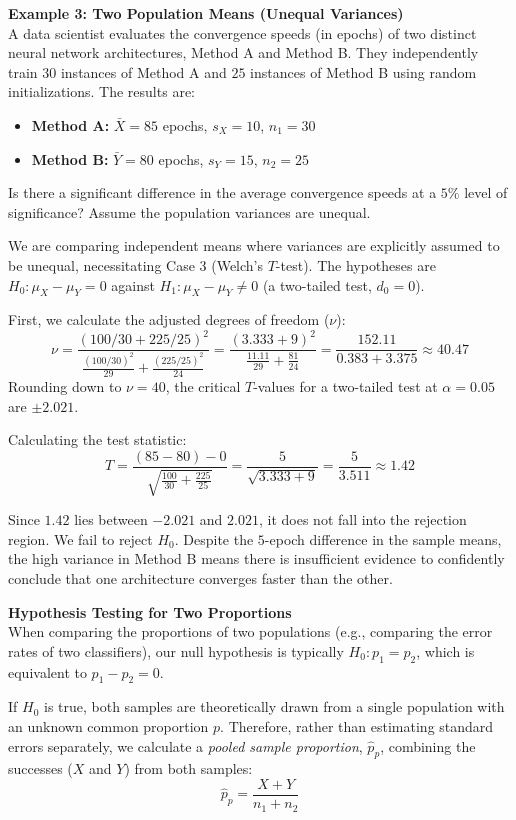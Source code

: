 \documentclass{article}
\begin{document}
\textbf{Example 3: Two Population Means (Unequal Variances)} \\
A data scientist evaluates the convergence speeds (in epochs) of two distinct neural network architectures, Method A and Method B. They independently train $30$ instances of Method A and $25$ instances of Method B using random initializations. The results are:
\begin{itemize}
    \item \textbf{Method A:} $\bar{X} = 85$ epochs, $s_X = 10$, $n_1 = 30$
    \item \textbf{Method B:} $\bar{Y} = 80$ epochs, $s_Y = 15$, $n_2 = 25$
\end{itemize}
Is there a significant difference in the average convergence speeds at a $5\%$ level of significance? Assume the population variances are unequal.

We are comparing independent means where variances are explicitly assumed to be unequal, necessitating Case 3 (Welch's $T$-test). The hypotheses are $H_0: \mu_X - \mu_Y = 0$ against $H_1: \mu_X - \mu_Y \neq 0$ (a two-tailed test, $d_0 = 0$).

First, we calculate the adjusted degrees of freedom ($\nu$):
$$ \nu = \frac{(100/30 + 225/25)^2}{\frac{(100/30)^2}{29} + \frac{(225/25)^2}{24}} = \frac{(3.333 + 9)^2}{\frac{11.11}{29} + \frac{81}{24}} = \frac{152.11}{0.383 + 3.375} \approx 40.47 $$
Rounding down to $\nu = 40$, the critical $T$-values for a two-tailed test at $\alpha=0.05$ are $\pm 2.021$. 

Calculating the test statistic:
$$ T = \frac{(85 - 80) - 0}{\sqrt{\frac{100}{30} + \frac{225}{25}}} = \frac{5}{\sqrt{3.333 + 9}} = \frac{5}{3.511} \approx 1.42 $$

Since $1.42$ lies between $-2.021$ and $2.021$, it does not fall into the rejection region. We fail to reject $H_0$. Despite the $5$-epoch difference in the sample means, the high variance in Method B means there is insufficient evidence to confidently conclude that one architecture converges faster than the other.

\vspace{1em}
\textbf{Hypothesis Testing for Two Proportions} \\
When comparing the proportions of two populations (e.g., comparing the error rates of two classifiers), our null hypothesis is typically $H_0: p_1 = p_2$, which is equivalent to $p_1 - p_2 = 0$. 

If $H_0$ is true, both samples are theoretically drawn from a single population with an unknown common proportion $p$. Therefore, rather than estimating standard errors separately, we calculate a \emph{pooled sample proportion}, $\hat{p}_p$, combining the successes ($X$ and $Y$) from both samples:
$$ \hat{p}_p = \frac{X + Y}{n_1 + n_2} $$
\end{document}
